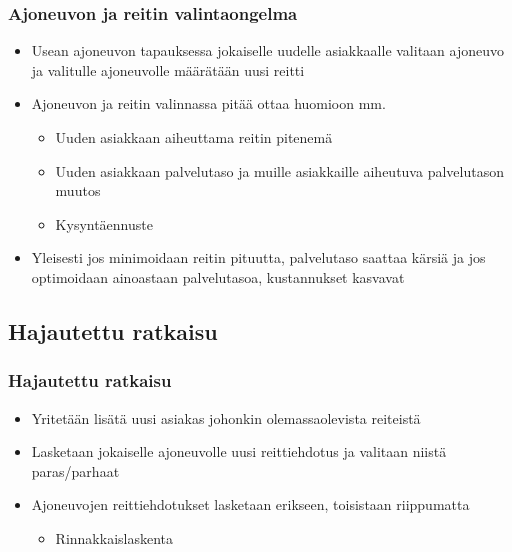 \documentclass{beamer}
\begin{document}
    
    
\begin{frame}
  \frametitle{Ajoneuvon ja reitin valintaongelma}   %
\begin{itemize}
 \item 
 Usean ajoneuvon tapauksessa jokaiselle uudelle asiakkaalle valitaan ajoneuvo ja valitulle ajoneuvolle määrätään uusi reitti
  \item
 Ajoneuvon ja reitin valinnassa pitää ottaa huomioon mm.
 \begin{itemize}
  \item 
  Uuden asiakkaan aiheuttama reitin pitenemä
  \item
  Uuden asiakkaan palvelutaso ja muille asiakkaille aiheutuva palvelutason muutos
  \item
  Kysyntäennuste
 \end{itemize}
\item
Yleisesti jos minimoidaan reitin pituutta, palvelutaso saattaa kärsiä ja jos optimoidaan ainoastaan palvelutasoa, kustannukset kasvavat
\end{itemize}
\end{frame}

\subsection{Hajautettu ratkaisu}
\begin{frame}
  \frametitle{Hajautettu ratkaisu}   %
\begin{itemize}
\item
Yritetään lisätä uusi asiakas johonkin olemassaolevista reiteistä %
\item
Lasketaan jokaiselle ajoneuvolle uusi reittiehdotus ja valitaan niistä paras/parhaat
\item
Ajoneuvojen reittiehdotukset lasketaan erikseen, toisistaan riippumatta 
\begin{itemize}
 \item 
 Rinnakkaislaskenta
\end{itemize}
\end{itemize}
\end{frame}
\end{document}
